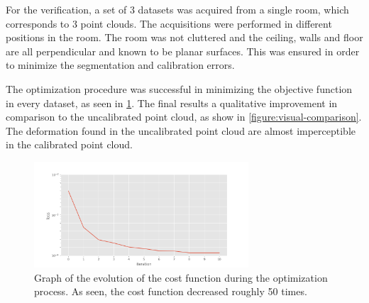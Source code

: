 \documentclass[conference]{IEEEtran}
\begin{document}
For the verification, a set of 3 datasets was acquired from a single room, which corresponds to 3 point clouds. The acquisitions were performed in different positions in the room. The room was not cluttered and the ceiling, walls and floor are all perpendicular and known to be planar surfaces. This was ensured in order to minimize the segmentation and calibration errors.

The optimization procedure was successful in minimizing the objective function in every dataset, as seen in \cref{table:iteration-results}. The final results a qualitative improvement in comparison to the uncalibrated point cloud, as show in \cref{figure:visual-comparison}. The deformation found in the uncalibrated point cloud are almost imperceptible in the calibrated point cloud.

\begin{figure}
    \centering
    \includegraphics[width=8cm]{images/calibration-evolution.png}
    \caption{Graph of the evolution of the cost function during the optimization process. As seen, the cost function decreased roughly 50 times.}
    \label{table:iteration-results}
\end{figure}
\end{document}
